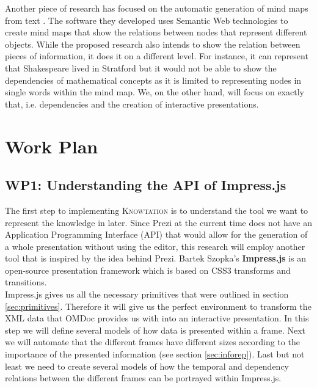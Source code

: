 \documentclass[twoside, 12pt]{article}
\newcommand{\sys}{\textsc{Knowtation}\xspace}
\begin{document}
Another piece of research has focused on the automatic generation of mind maps from text \cite{abdeen2009direct}. The software they developed uses Semantic Web technologies to create mind maps that show the relations between nodes that represent different objects. While the proposed research also intends to show the relation between pieces of information, it does it on a different level. For instance, it can represent that Shakespeare lived in Stratford but it would not be able to show the dependencies of mathematical concepts as it is limited to representing nodes in single words within the mind map. We, on the other hand, will focus on exactly that, i.e. dependencies and the creation of interactive presentations.\\


\section{Work Plan}
\label{sec:workplan}

\subsection{WP1: Understanding the API of Impress.js}
\label{sec:wp1}

The first step to implementing \sys is to understand the tool we want to represent the knowledge in later. Since Prezi at the current time does not have an Application Programming Interface (API) that would allow for the generation of a whole presentation without using the editor, this research will employ another tool that is inspired by the idea behind Prezi. Bartek Szopka's \textbf{Impress.js} \cite{JSImpress:npentrel14} is an open-source presentation framework which is based on CSS3 transforms and transitions.\\

Impress.js gives us all the necessary primitives that were outlined in section \ref{sec:primitives}. Therefore it will give us the perfect environment to transform the XML data that OMDoc provides us with into an interactive presentation. In this step we will define several models of how data is presented within a frame. Next we will automate that the different frames have different sizes according to the importance of the presented information (see section \ref{sec:inforep}). Last but not least we need to create several models of how the temporal and dependency relations between the different frames can be portrayed within Impress.js.\\
\end{document}
